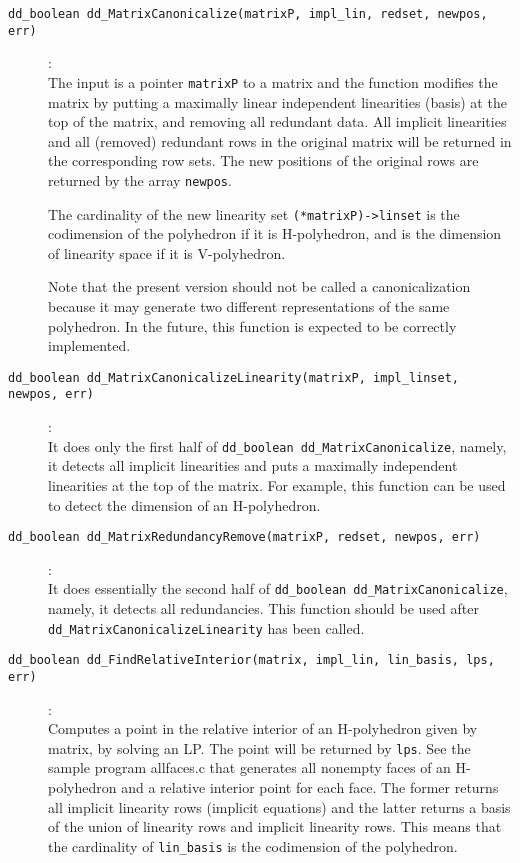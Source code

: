 \documentclass[11pt]{article}
\newcommand {\0} {{\bf 0}}
\begin{document}
\begin{description}
\item[{\tt dd\_boolean dd\_MatrixCanonicalize(matrixP, impl\_lin, redset, newpos, err)}]:\\
 The input is a pointer {\tt matrixP} to a matrix and the function
modifies the matrix by putting a maximally linear independent linearities (basis)
at the top of the matrix, and removing all redundant data.
All implicit linearities and all (removed) redundant rows
in the original matrix will be returned in the corresponding row sets.
The new positions of the original rows are returned by
the array {\tt newpos}.

The cardinality of the new linearity set {\tt  (*matrixP)->linset} is the codimension
of the polyhedron if it is H-polyhedron, and is the dimension of linearity space
if it is V-polyhedron.

Note that the present version should not be called a canonicalization
because it may generate two different representations of the same
polyhedron.  In the future, this function is expected to be correctly
implemented.

\item[{\tt dd\_boolean dd\_MatrixCanonicalizeLinearity(matrixP, impl\_linset, newpos, err)}]:\\
It does only the first half of {\tt dd\_boolean dd\_MatrixCanonicalize}, namely, it detects all
implicit linearities and puts a maximally independent linearities
at the top of the matrix.  For example, this function can be
used to detect the dimension of an H-polyhedron.

\item[{\tt dd\_boolean dd\_MatrixRedundancyRemove(matrixP, redset, newpos, err)}]:\\
It does essentially the second half of {\tt dd\_boolean dd\_MatrixCanonicalize},
namely, it detects all
redundancies.  This function should be used after {\tt dd\_MatrixCanonicalizeLinearity}
has been called.


\item[{\tt dd\_boolean dd\_FindRelativeInterior(matrix, impl\_lin, lin\_basis, lps, err)}]:\\
Computes a point in the relative interior of an H-polyhedron given by matrix, by solving
an LP. The point will be returned by {\tt lps}.
See the sample program allfaces.c that generates all nonempty faces of an H-polyhedron and
a relative interior point for each face.   The former returns all implicit linearity rows (implicit equations)
and the latter returns a basis of the union of linearity rows and implicit linearity rows.
This means that the cardinality of {\tt *lin\_basis} is the codimension of the polyhedron.



\end{description}
\end{document}
